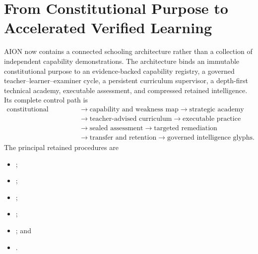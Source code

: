 
\section{From Constitutional Purpose to Accelerated Verified Learning}
\label{sec:aion-north-star-academy-glyphs}

AION now contains a connected schooling architecture rather than a collection
of independent capability demonstrations.  The architecture binds an immutable
constitutional purpose to an evidence-backed capability registry, a governed
teacher--learner--examiner cycle, a persistent curriculum supervisor, a
depth-first technical academy, executable assessment, and compressed retained
intelligence.  Its complete control path is
\begin{equation}
\begin{aligned}
\text{constitutional purpose}
&\rightarrow \text{capability and weakness map}
\rightarrow \text{strategic academy} \\
&\rightarrow \text{teacher-advised curriculum}
\rightarrow \text{executable practice} \\
&\rightarrow \text{sealed assessment}
\rightarrow \text{targeted remediation} \\
&\rightarrow \text{transfer and retention}
\rightarrow \text{governed intelligence glyphs}.
\end{aligned}
\label{eq:north-star-to-glyph-chain}
\end{equation}
The principal retained procedures are
\begin{center}
\begin{minipage}{0.96\linewidth}
\small
\begin{itemize}[leftmargin=1.6em]
    \item {};
    \item {};
    \item {};
    \item {};
    \item {}; and
    \item {}.
\end{itemize}
\end{minipage}
\end{center}

